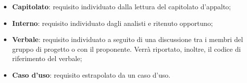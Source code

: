 \begin{itemize}
\begin{itemize}
\item \textbf{Capitolato}: requisito individuato dalla lettura del capitolato d'appalto;
\item \textbf{Interno}: requisito individuato dagli analisti e ritenuto opportuno;
\item \textbf{Verbale}: requisito individuato a seguito di una discussione tra i membri del gruppo di progetto o con il proponente. Verrà riportato, inoltre, il codice di riferimento del verbale;
\item \textbf{Caso d'uso}: requisito estrapolato da un caso d'uso.
\end{itemize}
\end{itemize}